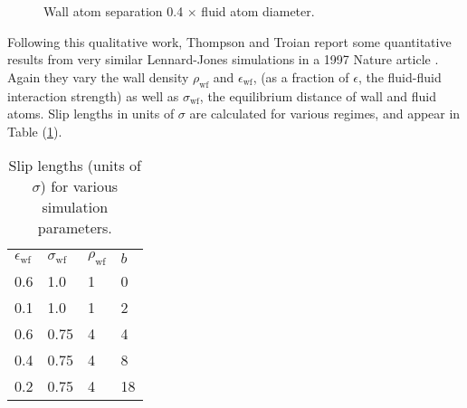\documentclass[12pt, a4paper, twoside, openright]{book}
\newcommand{\ewf}{\ensuremath{\epsilon_{\mathrm{wf}}}}
\begin{document}
\begin{figure}[ht]
\centering
{}
\caption{Wall atom separation 0.4 $\times$ fluid atom diameter.} \label{elastic}
\end{figure}

\vspace*{1em}

\clearpage
Following this qualitative work, Thompson and Troian report some quantitative results from very similar Lennard-Jones simulations in a 1997 Nature article \cite{ThompsonTroian1997}. Again they vary the wall density $\rho_{\mathrm{wf}}$ and \ewf, (as a fraction of $\epsilon$, the fluid-fluid interaction strength) as well as $\sigma_{\mathrm{wf}}$, the equilibrium distance of wall and fluid atoms. Slip lengths in units of $\sigma$ are calculated for various regimes, and appear in Table (\ref{tnt}).

\begin{table}[h]
\centering
\caption{Slip lengths (units of $\sigma$) for various simulation parameters.} \label{tnt}
\begin{tabular}{l l l l}
\ewf & $\sigma_{\mathrm{wf}}$ & $\rho_{\mathrm{wf}}$ & $b$ \\
0.6  & 1.0                    & 1                    & 0 \\
0.1  & 1.0                    & 1                    & 2 \\
0.6  & 0.75                   & 4                    & 4 \\
0.4  & 0.75                   & 4                    & 8 \\
0.2  & 0.75                   & 4                    & 18 \\
\end{tabular}

\end{table}
\end{document}
